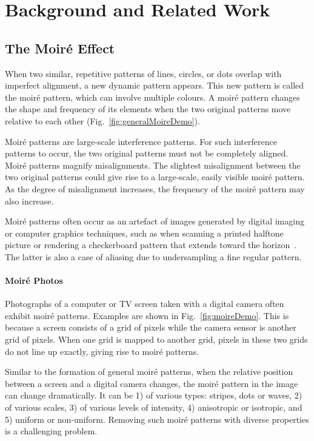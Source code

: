 \documentclass[journal]{IEEEtran}
\begin{document}
\section{Background and Related Work}
\subsection{The Moir\'{e} Effect}
When two similar, repetitive patterns of lines, circles, or dots overlap with imperfect alignment, a new dynamic pattern appears. This new pattern is called the moir\'{e} pattern, which can involve multiple colours. A moir\'{e} pattern changes the shape and frequency of its elements when the two original patterns move relative to each other (Fig.~\ref{fig:generalMoireDemo}).

Moir\'{e} patterns are large-scale interference patterns. For such interference patterns to occur, the two original patterns must not be completely aligned. Moir\'{e} patterns magnify misalignments. The slightest misalignment between the two original patterns could give rise to a large-scale, easily visible moir\'{e} pattern. As the degree of misalignment increases, the frequency of the moir\'{e} pattern may also increase.

Moir\'{e} patterns often occur as an artefact of images generated by digital imaging or computer graphics techniques, such as when scanning a printed halftone picture or rendering a checkerboard pattern that extends toward the horizon~\cite{WinNT}. The latter is also a case of aliasing due to undersampling a fine regular pattern.

\paragraph{Moir\'{e} Photos}
Photographs of a computer or TV screen taken with a digital camera often exhibit moir\'{e} patterns.
Examples are shown in Fig.~\ref{fig:moireDemo}. This is because a screen consists of a grid of pixels while the camera sensor is another grid of pixels. When one grid is mapped to another grid, pixels in these two grids do not line up exactly, giving rise to moir\'{e} patterns.

Similar to the formation of general moir\'{e} patterns, when the relative position between a screen and a digital camera changes, the moir\'{e} pattern in the image can change dramatically. It can be 1) of various types: stripes, dots or waves, 2) of various scales, 3) of various levels of intensity, 4) anisotropic or isotropic, and 5) uniform or non-uniform. Removing such moir\'{e} patterns with diverse properties is a challenging problem.
\end{document}
